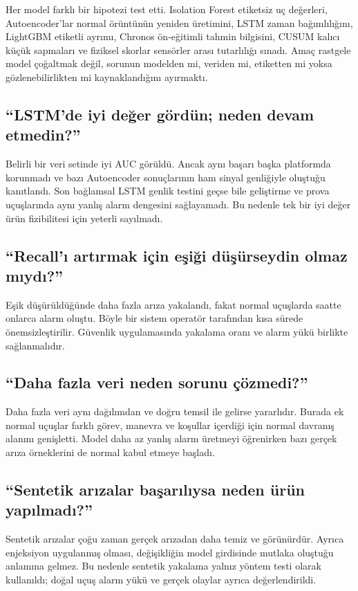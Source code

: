 \documentclass[11pt,a4paper]{article}
\begin{document}
Her model farklı bir hipotezi test etti. Isolation Forest etiketsiz uç değerleri,
Autoencoder'lar normal örüntünün yeniden üretimini, LSTM zaman bağımlılığını,
LightGBM etiketli ayrımı, Chronos ön-eğitimli tahmin bilgisini, CUSUM kalıcı
küçük sapmaları ve fiziksel skorlar sensörler arası tutarlılığı sınadı. Amaç
rastgele model çoğaltmak değil, sorunun modelden mi, veriden mi, etiketten mi
yoksa gözlenebilirlikten mi kaynaklandığını ayırmaktı.

\subsection*{``LSTM'de iyi değer gördün; neden devam etmedin?''}

Belirli bir veri setinde iyi AUC görüldü. Ancak aynı başarı başka platformda
korunmadı ve bazı Autoencoder sonuçlarının ham sinyal genliğiyle oluştuğu
kanıtlandı. Son bağlamsal LSTM genlik testini geçse bile geliştirme ve prova
uçuşlarında aynı yanlış alarm dengesini sağlayamadı. Bu nedenle tek bir iyi
değer ürün fizibilitesi için yeterli sayılmadı.

\subsection*{``Recall'ı artırmak için eşiği düşürseydin olmaz mıydı?''}

Eşik düşürüldüğünde daha fazla arıza yakalandı, fakat normal uçuşlarda saatte
onlarca alarm oluştu. Böyle bir sistem operatör tarafından kısa sürede
önemsizleştirilir. Güvenlik uygulamasında yakalama oranı ve alarm yükü birlikte
sağlanmalıdır.

\subsection*{``Daha fazla veri neden sorunu çözmedi?''}

Daha fazla veri aynı dağılımdan ve doğru temsil ile gelirse yararlıdır. Burada
ek normal uçuşlar farklı görev, manevra ve koşullar içerdiği için normal davranış
alanını genişletti. Model daha az yanlış alarm üretmeyi öğrenirken bazı gerçek
arıza örneklerini de normal kabul etmeye başladı.

\subsection*{``Sentetik arızalar başarılıysa neden ürün yapılmadı?''}

Sentetik arızalar çoğu zaman gerçek arızadan daha temiz ve görünürdür. Ayrıca
enjeksiyon uygulanmış olması, değişikliğin model girdisinde mutlaka oluştuğu
anlamına gelmez. Bu nedenle sentetik yakalama yalnız yöntem testi olarak
kullanıldı; doğal uçuş alarm yükü ve gerçek olaylar ayrıca değerlendirildi.
\end{document}
